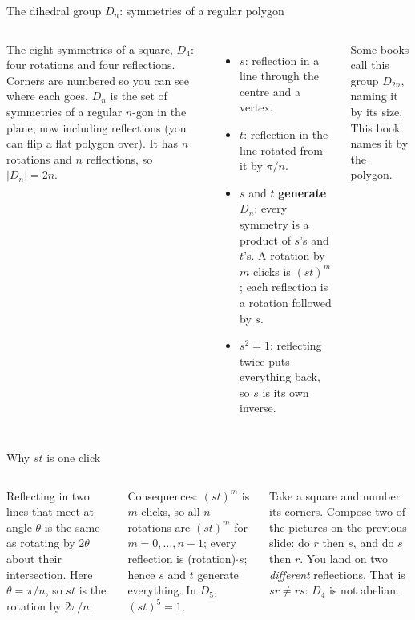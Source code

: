 \documentclass[aspectratio=169,10pt]{beamer}
\begin{document}
\begin{frame}{The dihedral group $D_n$: symmetries of a regular polygon}
\begin{columns}[T]
\centering\scalebox{0.55}{\figsquares}\par
{\scriptsize The eight symmetries of a square, $D_4$: four rotations and four reflections. Corners are numbered so you can see where each goes.}
\footnotesize $D_n$ is the set of symmetries of a regular $n$-gon in the plane, now including reflections (you can flip a flat polygon over). It has $n$ rotations and $n$ reflections, so $|D_n|=2n$.
\begin{itemize}
\item $s$: reflection in a line through the centre and a vertex.
\item $t$: reflection in the line rotated from it by $\pi/n$.
\item $s$ and $t$ \textbf{generate} $D_n$: every symmetry is a product of $s$'s and $t$'s. A rotation by $m$ clicks is $(st)^m$; each reflection is a rotation followed by $s$.
\item $s^2=1$: reflecting twice puts everything back, so $s$ is its own inverse.
\end{itemize}
\begin{pitbox}
Some books call this group $D_{2n}$, naming it by its size. This book names it by the polygon.
\end{pitbox}
\end{columns}
\end{frame}

\begin{frame}{Why $st$ is one click}
\begin{columns}[T]
\centering\scalebox{0.95}{\figpent}
\begin{whybox}
Reflecting in two lines that meet at angle $\theta$ is the same as rotating by $2\theta$ about their intersection. Here $\theta=\pi/n$, so $st$ is the rotation by $2\pi/n$.
\end{whybox}
Consequences: $(st)^m$ is $m$ clicks, so all $n$ rotations are $(st)^m$ for $m=0,\dots,n-1$; every reflection is (rotation)$\cdot s$; hence $s$ and $t$ generate everything. In $D_5$, $(st)^5=1$.
\begin{trybox}
Take a square and number its corners. Compose two of the pictures on the previous slide: do $r$ then $s$, and do $s$ then $r$. You land on two \emph{different} reflections. That is $sr\neq rs$: $D_4$ is not abelian.
\end{trybox}
\end{columns}
\end{frame}
\end{document}
